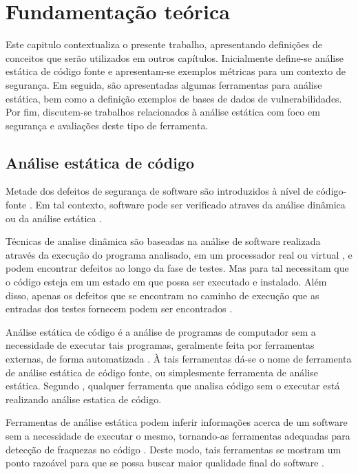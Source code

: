 \chapter{Fundamentação teórica}\label{fundamentacao_teorica}

Este capitulo contextualiza o presente trabalho, apresentando definições de conceitos que serão utilizados em outros capítulos. Inicialmente define-se análise estática de código fonte e apresentam-se exemplos métricas para um contexto de segurança. Em seguida, são apresentadas algumas ferramentas para análise estática, bem como a definição exemplos de bases de dados de vulnerabilidades. Por fim, discutem-se trabalhos relacionados à análise estática com foco em segurança e avaliações deste tipo de ferramenta.

\section{Análise estática de código}\label{fundamentacao_teorica::analise_estatica_de_codigo}

Metade dos defeitos de segurança de software são introduzidos à nível de código-fonte \cite{vadim}. Em tal contexto, software pode ser verificado atraves da análise dinâmica ou da análise estática \cite{concolic}.

Técnicas de analise dinâmica são baseadas na análise de software realizada através da execução do programa analisado, em um processador real ou virtual \cite{concolic}, e podem encontrar defeitos ao longo da fase de testes. Mas para tal necessitam que o código esteja em um estado em que possa ser executado e instalado. Além disso, apenas os defeitos que se encontram no caminho de execução que as entradas dos testes fornecem podem ser encontrados \cite{harvard}.

Análise estática de código é a análise de programas de computador sem a necessidade de executar tais programas, geralmente feita por ferramentas externas, de forma automatizada \cite{kannavara}. À tais ferramentas dá-se o nome de ferramenta de análise estática de código fonte, ou simplesmente ferramenta de análise estática. Segundo \cite{secure_programming}, qualquer ferramenta que analisa código sem o executar está realizando análise estatica de código.

Ferramentas de análise estática podem inferir informações  acerca de um software sem a necessidade de executar o mesmo, tornando-as ferramentas adequadas para detecção de fraquezas no código \cite{vadim}. Deste modo, tais ferramentas se mostram um ponto razoável para que se possa buscar maior qualidade final do software \cite{sa_spec}.

